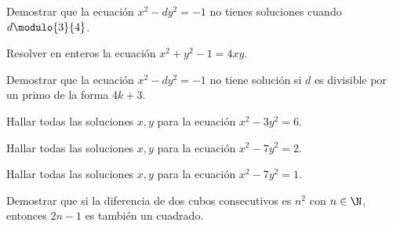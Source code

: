 \begin{exercise}
    Demostrar que la ecuación $x^2 - dy^2 = -1$ no tienes soluciones cuando $d \modulo{3}{4}$.
\end{exercise}

\begin{problem}
    Resolver en enteros la ecuación $x^2 + y^2 - 1 = 4xy$.
\end{problem}

\begin{problem}
    Demostrar que la ecuación $x^2 - dy^2 = -1$ no tiene solución si $d$ es divisible por un primo de la forma $4k + 3$.
\end{problem}

\begin{problem}
    Hallar todas las soluciones $x,y$ para la ecuación $x^2 - 3y^2 = 6$.
\end{problem}

\begin{problem}
    Hallar todas las soluciones $x,y$ para la ecuación $x^2 - 7y^2 = 2$.
\end{problem}

\begin{problem}
    Hallar todas las soluciones $x,y$ para la ecuación $x^2 - 7y^2 = 1$.
\end{problem}

\begin{problem}
    Demostrar que si la diferencia de dos cubos consecutivos es $n^{2}$ con $n \in \N$, entonces $2n - 1$ es también un cuadrado.
\end{problem}